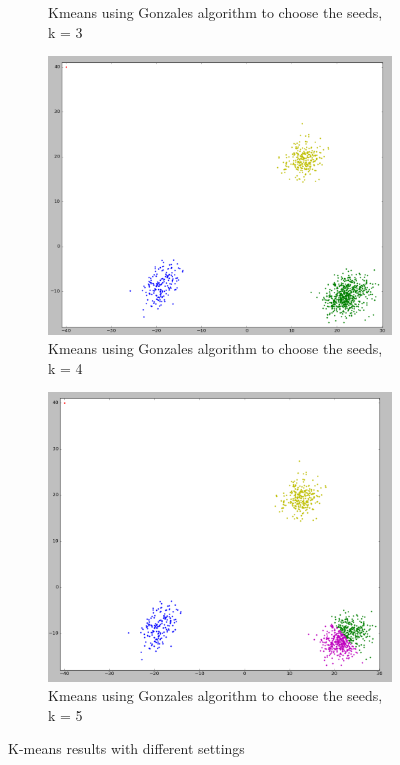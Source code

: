 \begin{figure}
\begin{subfigure}{.33\textwidth}
    \caption{Kmeans using Gonzales algorithm to choose the seeds, k = 3}
    \label{clusters_gonz}
  \end{subfigure}
  \begin{subfigure}{.33\textwidth}
    \centering
    \includegraphics[width=\textwidth]{shots/clusters-gonz-4}
    \caption{Kmeans using Gonzales algorithm to choose the seeds, k = 4}
    \label{1-trilinear-compositing}
  \end{subfigure}
  \begin{subfigure}{.33\textwidth}
    \centering
    \includegraphics[width=\textwidth]{shots/clusters-gonz-5}
    \caption{Kmeans using Gonzales algorithm to choose the seeds, k = 5}
    \label{1-trilinear-compositing}
  \end{subfigure}
  \caption{K-means results with different settings}
  \label{clustering_result}
\end{figure}
